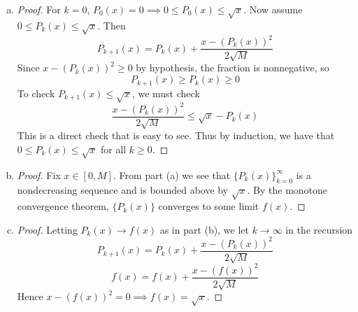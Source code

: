 \documentclass[11pt]{article}
\begin{document}
\begin{exercise}{2}
    \begin{enumerate} [(a)]
        \item \begin{proof}
            For $k = 0$, $P_0(x) = 0 \implies 0 \le P_0(x) \le \sqrt{x}$. Now assume $0 \le P_k(x) \le \sqrt{x}$. Then $$P_{k + 1}(x) = P_k(x) + \frac{x - (P_k(x))^2}{2 \sqrt{M}}$$ Since $x - (P_k(x))^2 \ge 0$ by hypothesis, the fraction is nonnegative, so $$P_{k + 1}(x) \ge P_k(x) \ge 0$$ To check $P_{k + 1}(x) \le \sqrt{x}$, we must check $$\frac{x - (P_k(x))^2}{2 \sqrt{M}} \le \sqrt{x} - P_k(x)$$ This is a direct check that is easy to see. Thus by induction, we have that $0 \le P_k(x) \le \sqrt{x}$ for all $k \ge 0$. 
        \end{proof}
        \item \begin{proof}
            Fix $x \in [0, M]$. From part (a) we see that $\{ P_k(x) \}_{k = 0}^\infty$ is a nondecreasing sequence and is bounded above by $\sqrt{x}$. By the monotone convergence theorem, $\{ P_k(x) \}$ converges to some limit $f(x)$.  
        \end{proof}
        \item \begin{proof}
            Letting $P_k (x) \to f(x)$ as in part (b), we let $k \to \infty$ in the recursion $$P_{k + 1}(x) = P_k(x) + \frac{x - (P_k(x))^2}{2 \sqrt{M}}$$ $$f(x) = f(x) + \frac{x - (f(x))^2}{2 \sqrt{M}}$$ Hence $x - (f(x))^2 = 0 \implies f(x) = \sqrt{x}$. 
        \end{proof}
    \end{enumerate}
\end{exercise}
\end{document}
